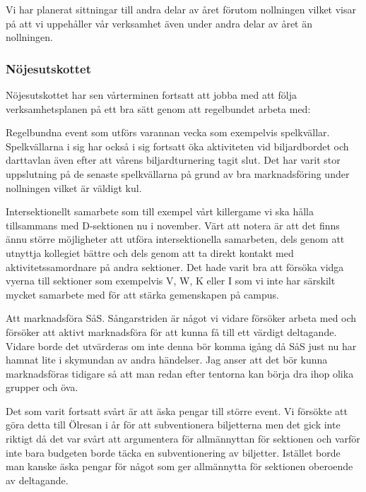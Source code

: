 \documentclass[../_main/handlingar.tex]{subfiles}
\begin{document}
Vi har planerat sittningar till andra delar av året förutom nollningen vilket visar på att vi uppehåller vår verksamhet även under andra delar av året än nollningen. 

\subsubsection*{Nöjesutskottet}
Nöjesutskottet har sen vårterminen fortsatt att jobba med att följa verksamhetsplanen på ett bra sätt genom att regelbundet arbeta med: 

Regelbundna event som utförs varannan vecka som exempelvis spelkvällar. Spelkvällarna i sig har också i sig fortsatt öka aktiviteten vid biljardbordet och darttavlan även efter att vårens biljardturnering tagit slut. Det har varit stor uppslutning på de senaste spelkvällarna på grund av bra marknadsföring under nollningen vilket är väldigt kul.

Intersektionellt samarbete som till exempel vårt killergame vi ska hålla tillsammans med D-sektionen nu i november. Värt att notera är att det finns ännu större möjligheter att utföra intersektionella samarbeten, dels genom att utnyttja kollegiet bättre och dels genom att ta direkt kontakt med aktivitetssamordnare på andra sektioner. Det hade varit bra att försöka vidga vyerna till sektioner som exempelvis V, W, K eller I som vi inte har särskilt mycket samarbete med för att stärka gemenskapen på campus. 

Att marknadsföra SåS. Sångarstriden är något vi vidare försöker arbeta med och försöker att aktivt marknadsföra för att kunna få till ett värdigt deltagande. Vidare borde det utvärderas om inte denna bör komma igång då SåS just nu har hamnat lite i skymundan av andra händelser. Jag anser att det bör kunna marknadsföras tidigare så att man redan efter tentorna kan börja dra ihop olika grupper och öva. 

Det som varit fortsatt svårt är att äska pengar till större event. Vi försökte att göra detta till Ölresan i år för att subventionera biljetterna men det gick inte riktigt då det var svårt att argumentera för allmännyttan för sektionen och varför inte bara budgeten borde täcka en subventionering av biljetter. Istället borde man kanske äska pengar för något som ger allmännytta för sektionen oberoende av deltagande. 
\end{document}

